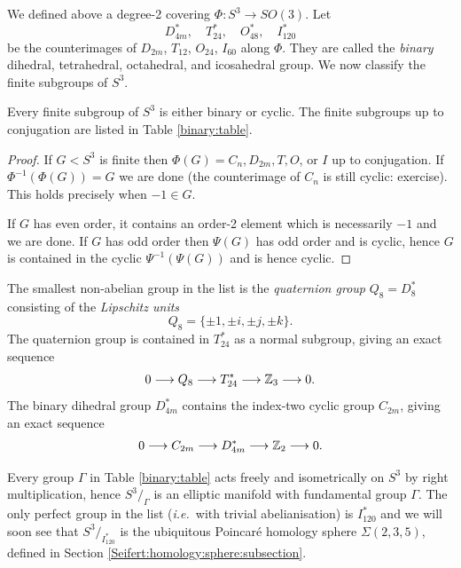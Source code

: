 We defined above a degree-2 covering $\Phi\colon S^3 \to SO(3)$. Let 
$$D_{4m}^*, \quad T_{24}^*, \quad O_{48}^*, \quad I_{120}^*$$ 
be the counterimages of $D_{2m}$, $T_{12}$, $O_{24}$, $I_{60}$ along $\Phi$. They are called the \emph{binary} dihedral, tetrahedral, octahedral, and icosahedral group. 
We now classify the finite subgroups of $S^3$.

\begin{prop}
Every finite subgroup of $S^3$ is either binary or cyclic. The finite subgroups up to conjugation are listed in Table \ref{binary:table}.
\end{prop}
\begin{proof}
If $G<S^3$ is finite then $\Phi(G) = C_n, D_{2m}, T, O$, or $I$ up to conjugation. If $\Phi^{-1}(\Phi(G)) = G$ we are done (the counterimage of $C_n$ is still cyclic: exercise). This holds precisely when $-1 \in G.$

If $G$ has even order, it contains an order-2 element which is necessarily $-1$ and we are done. If $G$ has odd order then $\Psi(G)$ has odd order and is cyclic, hence $G$ is contained in the cyclic $\Psi^{-1}(\Psi(G))$ and is hence cyclic.
\end{proof}

The smallest non-abelian group in the list is the \emph{quaternion group} $Q_8 = D_8^*$ consisting of the \emph{Lipschitz units} 
$$Q_8 = \{ \pm 1, \pm i, \pm j, \pm k \}.$$
The quaternion group is contained in $T_{24}^*$ as a normal subgroup, giving an exact sequence
\begin{equation} \label{Q8:eqn}
0 \longrightarrow Q_8 \longrightarrow T_{24}^* \longrightarrow \mathbb{Z}_3 \longrightarrow 0.
\end{equation}
The binary dihedral group $D_{4m}^*$ contains the index-two cyclic group $C_{2m}$, giving an exact sequence
\begin{equation} \label{D4n:eqn}
0 \longrightarrow C_{2m} \longrightarrow D_{4m}^* \longrightarrow \mathbb{Z}_2 \longrightarrow 0.
\end{equation}

\begin{rem}
Every group $\Gamma$ in Table \ref{binary:table} acts freely and isometrically on $S^3$ by right multiplication, hence $S^3/_\Gamma$ is an elliptic manifold with fundamental group $\Gamma$. The only perfect group in the list (\emph{i.e.}~with trivial abelianisation) is $I^*_{120}$ and we will soon see that $S^3/_{I^*_{120}}$ is the ubiquitous Poincar\'e homology sphere $\Sigma(2,3,5)$, defined in Section \ref{Seifert:homology:sphere:subsection}.
\end{rem}

